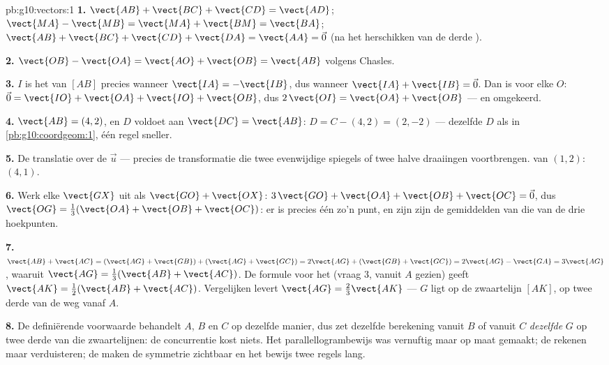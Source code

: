 \begin{solution}{pb:g10:vectors:1}
\textbf{1.} $\vect{AB} + \vect{BC} + \vect{CD} = \vect{AD}$; \quad
$\vect{MA} - \vect{MB} = \vect{MA} + \vect{BM} = \vect{BA}$; \quad
$\vect{AB} + \vect{BC} + \vect{CD} + \vect{DA} = \vect{AA} = \vec 0$ (na het
herschikken van de derde ).

\textbf{2.} $\vect{OB} - \vect{OA} = \vect{AO} + \vect{OB} = \vect{AB}$
volgens Chasles.

\textbf{3.} $I$ is het  van $[AB]$ precies wanneer
$\vect{IA} = -\vect{IB}$, dus wanneer $\vect{IA} + \vect{IB} = \vec 0$. Dan
is voor elke $O$: $\vec 0 = \vect{IO} + \vect{OA} + \vect{IO} + \vect{OB}$,
dus $2\,\vect{OI} = \vect{OA} + \vect{OB}$ --- en omgekeerd.

\textbf{4.} $\vect{AB} = (4, 2)$, en $D$ voldoet aan
$\vect{DC} = \vect{AB}$: $D = C - (4, 2) = (2, -2)$ --- dezelfde $D$ als in
\cref{pb:g10:coordgeom:1}, één regel sneller.

\textbf{5.} De translatie over de  $\vec u$ --- precies de
transformatie die twee evenwijdige spiegels of twee halve draaiingen
voortbrengen.  van $(1, 2)$: $(4, 1)$.

\textbf{6.} Werk elke $\vect{GX}$ uit als $\vect{GO} + \vect{OX}$:
$3\,\vect{GO} + \vect{OA} + \vect{OB} + \vect{OC} = \vec 0$, dus
$\vect{OG} = \frac13(\vect{OA} + \vect{OB} + \vect{OC})$: er is precies één
zo'n punt, en zijn  zijn de gemiddelden van die van de drie
hoekpunten.

\textbf{7.} $\vect{AB} + \vect{AC} = (\vect{AG} + \vect{GB}) +
(\vect{AG} + \vect{GC}) = 2\vect{AG} + (\vect{GB} + \vect{GC})
= 2\vect{AG} - \vect{GA} = 3\vect{AG}$, waaruit
$\vect{AG} = \frac13(\vect{AB} + \vect{AC})$. De formule voor het 
(vraag 3, vanuit $A$ gezien) geeft
$\vect{AK} = \frac12(\vect{AB} + \vect{AC})$. Vergelijken levert
$\vect{AG} = \frac23\vect{AK}$ --- $G$ ligt op de zwaartelijn $[AK]$, op twee
derde van de weg vanaf $A$.

\textbf{8.} De definiërende voorwaarde behandelt $A$, $B$ en $C$ op dezelfde
manier, dus zet dezelfde berekening vanuit $B$ of vanuit $C$ \emph{dezelfde}
$G$ op twee derde van die zwaartelijnen: de concurrentie kost niets. Het
parallellogrambewijs was vernuftig maar op maat gemaakt; de 
rekenen maar verduisteren; de  maken de symmetrie zichtbaar en het
bewijs twee regels lang.


\end{solution}
